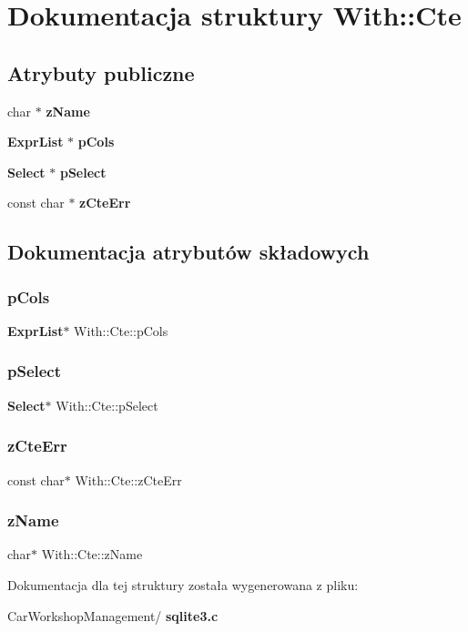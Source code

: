 \section{Dokumentacja struktury With\+::Cte}
\label{struct_with_1_1_cte}
\subsection*{Atrybuty publiczne}
\begin{DoxyCompactItemize}
\item 
char $\ast$ \textbf{ z\+Name}
\item 
\textbf{ Expr\+List} $\ast$ \textbf{ p\+Cols}
\item 
\textbf{ Select} $\ast$ \textbf{ p\+Select}
\item 
const char $\ast$ \textbf{ z\+Cte\+Err}
\end{DoxyCompactItemize}


\subsection{Dokumentacja atrybutów składowych}
\mbox{\label{struct_with_1_1_cte_a9e43b7bf43ff5878c465f683fc464456}} 
\subsubsection{pCols}
{\footnotesize\ttfamily \textbf{ Expr\+List}$\ast$ With\+::\+Cte\+::p\+Cols}

\mbox{\label{struct_with_1_1_cte_a90fd9f2a4529a6fd1e75cabeccec16cd}} 
\subsubsection{pSelect}
{\footnotesize\ttfamily \textbf{ Select}$\ast$ With\+::\+Cte\+::p\+Select}

\mbox{\label{struct_with_1_1_cte_a2e0558ed352afe93f08cb8a9ed407223}} 
\subsubsection{zCteErr}
{\footnotesize\ttfamily const char$\ast$ With\+::\+Cte\+::z\+Cte\+Err}

\mbox{\label{struct_with_1_1_cte_a3ce66361944f92f0d3fc354025320dd6}} 
\subsubsection{zName}
{\footnotesize\ttfamily char$\ast$ With\+::\+Cte\+::z\+Name}



Dokumentacja dla tej struktury została wygenerowana z pliku\+:\begin{DoxyCompactItemize}
\item 
Car\+Workshop\+Management/\textbf{ sqlite3.\+c}\end{DoxyCompactItemize}
